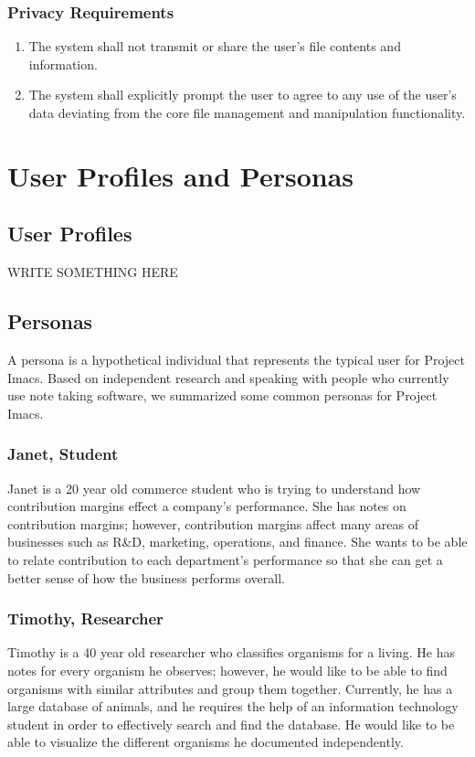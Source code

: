 \documentclass{article}
\begin{document}
\subsubsection{Privacy Requirements}
\begin{enumerate}[PR{I}1]
    \item The system shall not transmit or share the user's file contents and information.
    \item The system shall explicitly prompt the user to agree to any use of the user's data deviating from the core file management and manipulation functionality.
\end{enumerate}

\section{User Profiles and Personas}
\subsection{User Profiles}
WRITE SOMETHING HERE

\subsection{Personas}
A persona is a hypothetical individual that represents the typical user for Project Imacs. Based on independent research and speaking with people who currently use note taking software, we summarized some common personas for Project Imacs.

\subsubsection{Janet, Student}
Janet is a 20 year old commerce student who is trying to understand how contribution margins effect a company's performance. She has notes on contribution margins; however, contribution margins affect many areas of businesses such as R\&D, marketing, operations, and finance. She wants to be able to relate contribution to each department's performance so that she can get a better sense of how the business performs overall.

\subsubsection{Timothy, Researcher}
Timothy is a 40 year old researcher who classifies organisms for a living. He has notes for every organism he observes; however, he would like to be able to find organisms with similar attributes and group them together. Currently, he has a large database of animals, and he requires the help of an information technology student in order to effectively search and find the database. He would like to be able to visualize the different organisms he documented independently.
\end{document}
